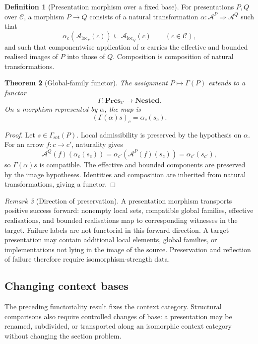 \documentclass[11pt]{article}
\theoremstyle{plain}
\newtheorem{theorem}{Theorem}[section]
\theoremstyle{definition}
\newtheorem{definition}[theorem]{Definition}
\theoremstyle{remark}
\newtheorem{remark}[theorem]{Remark}
\newcommand{\LocalAdm}{\mathcal{A}_{\mathrm{loc}}}
\begin{document}
\begin{definition}[Presentation morphism over a fixed base]
\label{def:presentation-morphism-fixed-base}
For presentations $P,Q$ over $\mathcal C$, a morphism $P\to Q$ consists of a
natural transformation $\alpha:\mathcal A^P\Rightarrow\mathcal A^Q$ such that
\[
\alpha_c(\LocalAdm_P(c))\subseteq\LocalAdm_Q(c)
\qquad(c\in\mathcal C),
\]
and such that componentwise application of $\alpha$ carries the effective and
bounded realised images of $P$ into those of $Q$. Composition is composition of
natural transformations.
\end{definition}

\begin{theorem}[Global-family functor]
\label{thm:global-family-functor-monograph}
The assignment $P\mapsto\Gamma(P)$ extends to a functor
\[
\Gamma:\mathbf{Pres}_{\mathcal C}\longrightarrow\mathbf{Nested}.
\]
On a morphism represented by $\alpha$, the map is
\[
(\Gamma(\alpha)s)_c=\alpha_c(s_c).
\]
\end{theorem}

\begin{proof}
Let $s\in\Gamma_{\mathrm{set}}(P)$. Local admissibility is preserved by the
hypothesis on $\alpha$. For an arrow $f:c\to c'$, naturality gives
\[
\mathcal A^Q(f)(\alpha_c(s_c))
=\alpha_{c'}(\mathcal A^P(f)(s_c))
=\alpha_{c'}(s_{c'}),
\]
so $\Gamma(\alpha)s$ is compatible. The effective and bounded components are
preserved by the image hypotheses. Identities and composition are inherited from
natural transformations, giving a functor.
\end{proof}

\begin{remark}[Direction of preservation]
A presentation morphism transports positive success forward: nonempty local
sets, compatible global families, effective realisations, and bounded
realisations map to corresponding witnesses in the target. Failure labels are not
functorial in this forward direction. A target presentation may contain
additional local elements, global families, or implementations not lying in the
image of the source. Preservation and reflection of failure therefore require
isomorphism-strength data.
\end{remark}

\subsection{Changing context bases}

The preceding functoriality result fixes the context category. Structural
comparisons also require controlled changes of base: a presentation may be
renamed, subdivided, or transported along an isomorphic context category without
changing the section problem.
\end{document}
